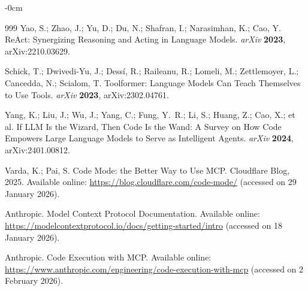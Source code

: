 \documentclass[journal,article,submit,pdftex,moreauthors]{Definitions/mdpi}
\begin{document}
\begin{adjustwidth}{-\extralength}{0cm}



% 


\begin{thebibliography}{999}
Yao, S.; Zhao, J.; Yu, D.; Du, N.; Shafran, I.; Narasimhan, K.; Cao, Y. ReAct: Synergizing Reasoning and Acting in Language Models. \textit{arXiv} \textbf{2023}, arXiv:2210.03629.

Schick, T.; Dwivedi-Yu, J.; Dess\'i, R.; Raileanu, R.; Lomeli, M.; Zettlemoyer, L.; Cancedda, N.; Scialom, T. Toolformer: Language Models Can Teach Themselves to Use Tools. \textit{arXiv} \textbf{2023}, arXiv:2302.04761.

Yang, K.; Liu, J.; Wu, J.; Yang, C.; Fung, Y.~R.; Li, S.; Huang, Z.; Cao, X.; et al. If LLM Is the Wizard, Then Code Is the Wand: A Survey on How Code Empowers Large Language Models to Serve as Intelligent Agents. \textit{arXiv} \textbf{2024}, arXiv:2401.00812.

Varda, K.; Pai, S. Code Mode: the Better Way to Use MCP. Cloudflare Blog, 2025. Available online: \url{https://blog.cloudflare.com/code-mode/} (accessed on 29 January 2026).

Anthropic. Model Context Protocol Documentation. Available online: \url{https://modelcontextprotocol.io/docs/getting-started/intro} (accessed on 18 January 2026).

Anthropic. Code Execution with MCP. Available online: \url{https://www.anthropic.com/engineering/code-execution-with-mcp} (accessed on 2 February 2026).


\end{thebibliography}
\end{adjustwidth}
\end{document}
